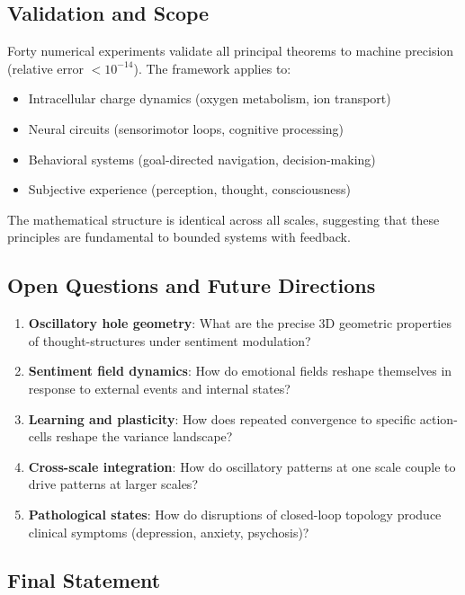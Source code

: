 \documentclass[twocolumn,11pt,a4paper]{article}
\begin{document}
\subsection{Validation and Scope}

Forty numerical experiments validate all principal theorems to machine precision (relative error $< 10^{-14}$). The framework applies to:

\begin{itemize}
\item Intracellular charge dynamics (oxygen metabolism, ion transport)
\item Neural circuits (sensorimotor loops, cognitive processing)
\item Behavioral systems (goal-directed navigation, decision-making)
\item Subjective experience (perception, thought, consciousness)
\end{itemize}

The mathematical structure is identical across all scales, suggesting that these principles are fundamental to bounded systems with feedback.

\subsection{Open Questions and Future Directions}

\begin{enumerate}[label=(\arabic*),leftmargin=*]
\item \textbf{Oscillatory hole geometry}: What are the precise 3D geometric properties of thought-structures under sentiment modulation?
\item \textbf{Sentiment field dynamics}: How do emotional fields reshape themselves in response to external events and internal states?
\item \textbf{Learning and plasticity}: How does repeated convergence to specific action-cells reshape the variance landscape?
\item \textbf{Cross-scale integration}: How do oscillatory patterns at one scale couple to drive patterns at larger scales?
\item \textbf{Pathological states}: How do disruptions of closed-loop topology produce clinical symptoms (depression, anxiety, psychosis)?
\end{enumerate}

\subsection{Final Statement}
\end{document}

